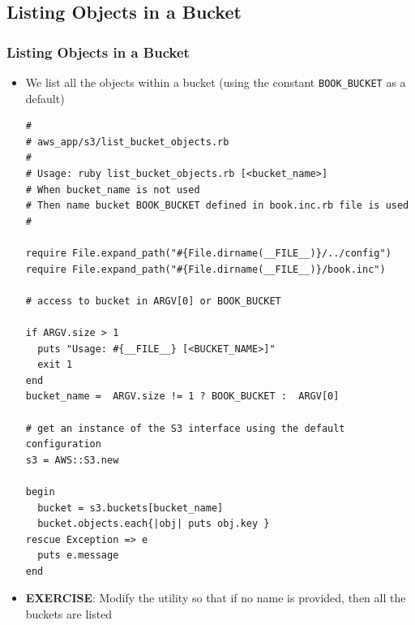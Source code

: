 \documentclass{beamer}
\begin{document}
\subsection{Listing Objects in a Bucket}
\begin{frame}
\frametitle{Listing Objects in a Bucket}
\begin{itemize}
 \item We list all the objects within a bucket (using the constant \texttt{BOOK\_BUCKET} as a default)

\lstset{language=Ruby, style=eclipse}
\begin{lstlisting}
#
# aws_app/s3/list_bucket_objects.rb
#
# Usage: ruby list_bucket_objects.rb [<bucket_name>]
# When bucket_name is not used
# Then name bucket BOOK_BUCKET defined in book.inc.rb file is used
#

require File.expand_path("#{File.dirname(__FILE__)}/../config")
require File.expand_path("#{File.dirname(__FILE__)}/book.inc")

# access to bucket in ARGV[0] or BOOK_BUCKET

if ARGV.size > 1
  puts "Usage: #{__FILE__} [<BUCKET_NAME>]"
  exit 1
end
bucket_name =  ARGV.size != 1 ? BOOK_BUCKET :  ARGV[0]

# get an instance of the S3 interface using the default configuration
s3 = AWS::S3.new

begin
  bucket = s3.buckets[bucket_name]
  bucket.objects.each{|obj| puts obj.key }
rescue Exception => e
  puts e.message
end
\end{lstlisting}

\item \textbf{EXERCISE}: Modify the utility so that if no name is provided, then all the buckets are listed
\end{itemize}

\end{frame}
\end{document}
